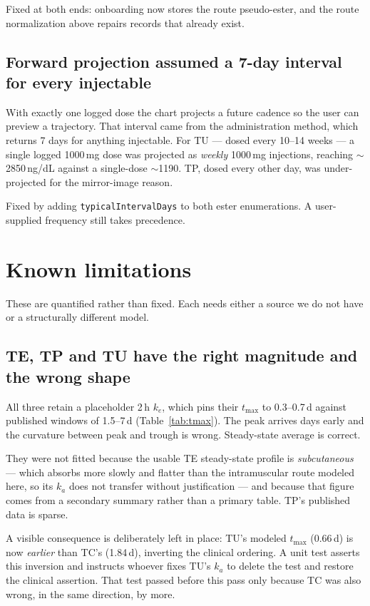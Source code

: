 \documentclass[11pt,a4paper]{article}
\newcommand{\code}[1]{\texttt{\small #1}}
\begin{document}
Fixed at both ends: onboarding now stores the route pseudo-ester, and the route
normalization above repairs records that already exist.

\subsection{Forward projection assumed a 7-day interval for every injectable}

With exactly one logged dose the chart projects a future cadence so the user can
preview a trajectory. That interval came from the administration method, which
returns 7 days for anything injectable. For TU --- dosed every 10--14 weeks --- a
single logged 1000\,mg dose was projected as \emph{weekly} 1000\,mg injections,
reaching $\sim$2850\,ng/dL against a single-dose $\sim$1190. TP, dosed every other
day, was under-projected for the mirror-image reason.

Fixed by adding \code{typicalIntervalDays} to both ester enumerations. A
user-supplied frequency still takes precedence.

\section{Known limitations}
\label{sec:limitations}

These are quantified rather than fixed. Each needs either a source we do not have
or a structurally different model.

\subsection{TE, TP and TU have the right magnitude and the wrong shape}

All three retain a placeholder 2\,h $k_e$, which pins their $t_{\max}$ to
0.3--0.7\,d against published windows of 1.5--7\,d (Table~\ref{tab:tmax}). The
peak arrives days early and the curvature between peak and trough is wrong.
Steady-state average is correct.

They were not fitted because the usable TE steady-state profile is
\emph{subcutaneous} --- which absorbs more slowly and flatter than the
intramuscular route modeled here, so its $k_a$ does not transfer without
justification --- and because that figure comes from a secondary summary rather
than a primary table. TP's published data is sparse.

A visible consequence is deliberately left in place: TU's modeled $t_{\max}$
(0.66\,d) is now \emph{earlier} than TC's (1.84\,d), inverting the clinical
ordering. A unit test asserts this inversion and instructs whoever fixes TU's
$k_a$ to delete the test and restore the clinical assertion. That test passed
before this pass only because TC was also wrong, in the same direction, by more.
\end{document}
